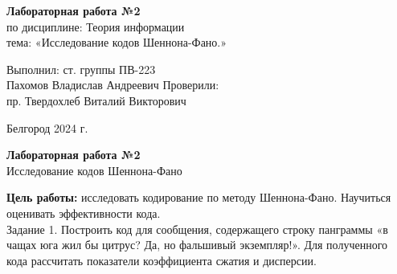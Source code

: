 \documentclass[a4paper,14pt]{extarticle}
\newcommand\textbox[1]{
	\parbox{.45\textwidth}{#1}
}
\begin{document}
\vfill
\begin{center}
    \large{
        \textbf{
            Лабораторная работа №2}}\\
    \normalsize{
        по дисциплине: Теория информации \\
        тема: «Исследование кодов Шеннона-Фано.»}
\end{center}
\vfill
\hfill\textbox{
    Выполнил: ст. группы ПВ-223\\Пахомов Владислав Андреевич
    \bigbreak
    Проверили: \\пр. Твердохлеб Виталий Викторович
}
\vfill\begin{center}
    Белгород 2024 г.
\end{center}
\newpage
\begin{center}
    \textbf{Лабораторная работа №2}\\
    Исследование кодов Шеннона-Фано\\
\end{center}
\textbf{Цель работы: }исследовать кодирование по методу Шеннона-Фано. Научиться оценивать эффективности кода.\\
Задание 1. Построить код для сообщения, содержащего строку панграммы
«в чащах юга жил бы цитрус? Да, но фальшивый экземпляр!».
Для полученного кода рассчитать показатели коэффициента сжатия и
дисперсии.\\
\end{document}
